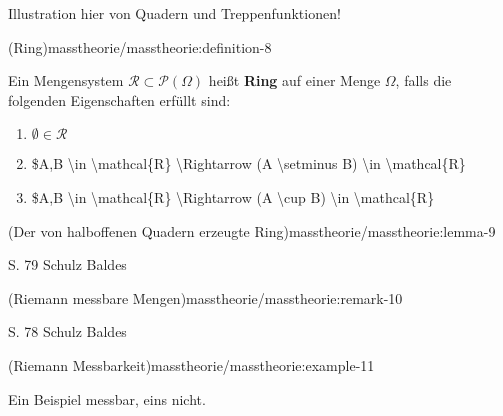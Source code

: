 \par
Illustration hier von Quadern und Treppenfunktionen!
\begin{definition}{(Ring)}{masstheorie/masstheorie:definition-8}



\par
Ein Mengensystem \(\mathcal{R} \subset \mathcal{P}(\Omega)\) heißt \textbf{Ring} auf einer Menge \(\Omega\), falls die folgenden Eigenschaften erfüllt sind:
\begin{enumerate}

\item {} 
\par
\(\emptyset \in \mathcal{R}\)

\item {} 
\par
\$A,B \textbackslash{}in \textbackslash{}mathcal\{R\} \textbackslash{}Rightarrow (A \textbackslash{}setminus B) \textbackslash{}in \textbackslash{}mathcal\{R\}

\item {} 
\par
\$A,B \textbackslash{}in \textbackslash{}mathcal\{R\} \textbackslash{}Rightarrow (A \textbackslash{}cup B) \textbackslash{}in \textbackslash{}mathcal\{R\}

\end{enumerate}
\end{definition}
\begin{lemma}{(Der von halboffenen Quadern erzeugte Ring)}{masstheorie/masstheorie:lemma-9}



\par
S. 79 Schulz Baldes
\end{lemma}
\begin{remark}{(Riemann messbare Mengen)}{masstheorie/masstheorie:remark-10}



\par
S. 78 Schulz Baldes
\end{remark}
\begin{example}{(Riemann Messbarkeit)}{masstheorie/masstheorie:example-11}



\par
Ein Beispiel messbar, eins nicht.
\end{example}

